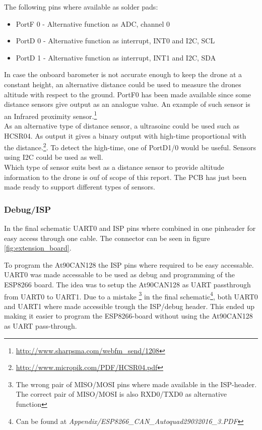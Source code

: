 The following pins where available as solder pads:
\begin{itemize}
	\item PortF 0 - Alternative function as ADC, channel 0
	\item PortD 0 - Alternative function as interrupt, INT0 and I2C, SCL
	\item PortD 1 - Alternative function as interrupt, INT1 and I2C, SDA
\end{itemize}
In case the onboard barometer is not accurate enough to keep the drone at a constant height, an alternative distance could be used to measure the drones altitude with respect to the ground.
PortF0 has been made available since some distance sensors give output as an analogue value. 
An example of such sensor is an Infrared proximity sensor.\footnote{\url{http://www.sharpsma.com/webfm\_send/1208}} \\
As an alternative type of distance sensor, a ultrasoinc could be used such as HCSR04.
As output it gives a binary output with high-time proportional with the distance.\footnote{\url{http://www.micropik.com/PDF/HCSR04.pdf}}.
To detect the high-time, one of PortD1/0 would be useful.
Sensors using I2C could be used as well.\\
Which type of sensor suits best as a distance sensor to provide altitude information to the drone is ouf of scope of this report. The PCB has just been made ready to support different types of sensors.

\subsubsection*{Debug/ISP}
In the final schematic \ac{UART}0 and ISP pins where combined in one pinheader for easy access through one cable.
The connector can be seen in figure \ref{fig:extension_board}.

To program the At90CAN128 the ISP pins where required to be easy accessable. 
\ac{UART}0 was made accessable to be used as debug and programming of the ESP8266 board.
The idea was to setup the At90CAN128 as \ac{UART} passthrough from \ac{UART}0 to \ac{UART}1.
Due to a mistake \footnote{The wrong pair of MISO/MOSI pins where made available in the ISP-header. The correct pair of MISO/MOSI is also RXD0/TXD0 as alternative function} in the final schematic\footnote{Can be found at \textit{Appendix/ESP8266\_CAN\_Autoquad29032016\_3.PDF}}, both \ac{UART}0 and \ac{UART}1 where made accessible trough the ISP/debug header. 
This ended up making it easier to program the ESP8266-board without using the At90CAN128 as \ac{UART} pass-through.

